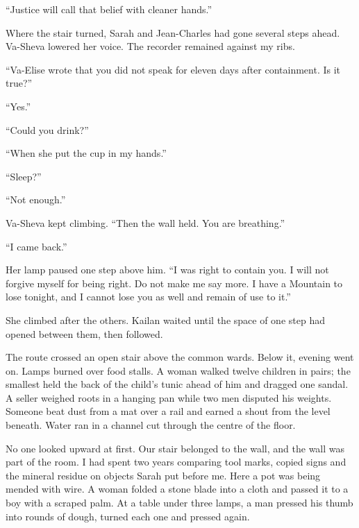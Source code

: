 ``Justice will call that belief with cleaner hands.''\par

Where the stair turned, Sarah and Jean-Charles had gone several steps ahead. Va-Sheva lowered her voice. The recorder remained against my ribs.\par

``Va-Elise wrote that you did not speak for eleven days after containment. Is it true?''\par

``Yes.''\par

``Could you drink?''\par

``When she put the cup in my hands.''\par

``Sleep?''\par

``Not enough.''\par

Va-Sheva kept climbing. ``Then the wall held. You are breathing.''\par

``I came back.''\par

Her lamp paused one step above him. ``I was right to contain you. I will not forgive myself for being right. Do not make me say more. I have a Mountain to lose tonight, and I cannot lose you as well and remain of use to it.''\par

She climbed after the others. Kailan waited until the space of one step had opened between them, then followed.\par

\ornament

The route crossed an open stair above the common wards. Below it, evening went on. Lamps burned over food stalls. A woman walked twelve children in pairs; the smallest held the back of the child's tunic ahead of him and dragged one sandal. A seller weighed roots in a hanging pan while two men disputed his weights. Someone beat dust from a mat over a rail and earned a shout from the level beneath. Water ran in a channel cut through the centre of the floor.\par

No one looked upward at first. Our stair belonged to the wall, and the wall was part of the room. I had spent two years comparing tool marks, copied signs and the mineral residue on objects Sarah put before me. Here a pot was being mended with wire. A woman folded a stone blade into a cloth and passed it to a boy with a scraped palm. At a table under three lamps, a man pressed his thumb into rounds of dough, turned each one and pressed again.\par

